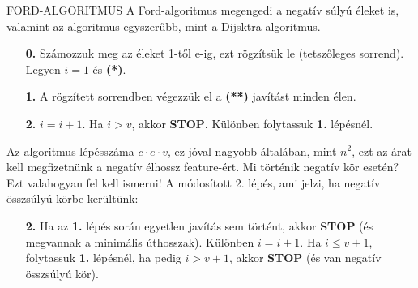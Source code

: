 \begin{tetel}{FORD-ALGORITMUS}
A Ford-algoritmus megengedi a negatív súlyú éleket is, valamint az algoritmus egyszerűbb, mint a Dijsktra-algoritmus.
\begin{itemize}
\item[\textbf{0.}] Számozzuk meg az éleket 1-től e-ig, ezt rögzítsük le (tetszőleges sorrend). Legyen $i = 1$ és \textbf{(*)}.
\item[\textbf{1.}] A rögzített sorrendben végezzük el a \textbf{(**)} javítást minden élen.
\item[\textbf{2.}] $i = i + 1$. Ha $i > v$, akkor \textbf{STOP}. Különben folytassuk \textbf{1.} lépésnél.
\end{itemize}
Az algoritmus lépésszáma $c\cdot e\cdot v$, ez jóval nagyobb általában, mint $n^2$, ezt az árat kell megfizetnünk a negatív élhossz feature-ért. Mi történik negatív kör esetén? Ezt valahogyan fel kell ismerni! A módosított 2. lépés, ami jelzi, ha negatív összsúlyú körbe kerültünk:
\begin{itemize}
\item[\textbf{2.}] Ha az \textbf{1.} lépés során egyetlen javítás sem történt, akkor \textbf{STOP} (és megvannak a minimális úthosszak). Különben $i = i + 1$. Ha $i \leq v + 1$, folytassuk \textbf{1.} lépésnél, ha pedig $i > v + 1$, akkor \textbf{STOP} (és van negatív összsúlyú kör).
\end{itemize}
\end{tetel}
